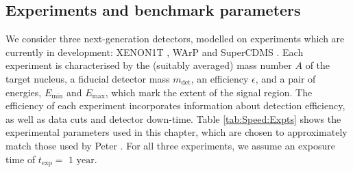 \subsection{Experiments and benchmark parameters}
\label{sec:Speed:Experiments}
We consider three next-generation detectors, modelled on experiments which are currently in development: XENON1T \cite{Aprile:2009a}, WArP \cite{Szelc:2009} and SuperCDMS \cite{Bruch:2010}. Each experiment is characterised by the (suitably averaged) mass number $A$ of the target nucleus, a fiducial detector mass \(m_\textrm{det}\), an efficiency $\epsilon$, and a pair of energies, \(E_\textrm{min}\) and \(E_\textrm{max}\), which mark the extent of the signal region. The efficiency of each experiment incorporates information about detection efficiency, as well as data cuts and detector down-time. Table \ref{tab:Speed:Expts} shows the experimental parameters used in this chapter, which are chosen to approximately match those used by Peter \cite{Peter:2011}. For all three experiments, we assume an exposure time of $t_\textrm{exp} = \textrm{ 1 year}$.


